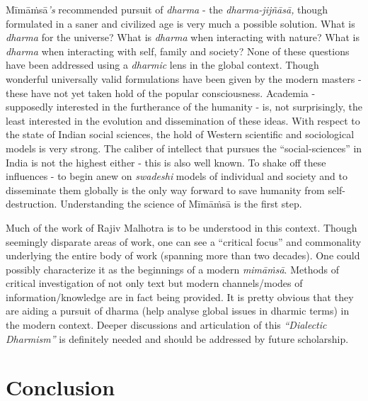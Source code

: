 Mīmāṁsā\textit{’s} recommended pursuit of \textit{dharma} - the \textit{dharma-jijñāsā,} though formulated in a saner and civilized age is very much a possible solution. What is \textit{dharma} for the universe? What is \textit{dharma} when interacting with nature? What is \textit{dharma} when interacting with self, family and society? None of these questions have been addressed using a \textit{dharmic} lens in the global context. Though wonderful universally valid formulations have been given by the modern masters - these have not yet taken hold of the popular consciousness. Academia - supposedly interested in the furtherance of the humanity - is, not surprisingly, the least interested in the evolution and dissemination of these ideas. With respect to the state of Indian social sciences, the hold of Western scientific and sociological models is very strong. The caliber of intellect that pursues the “social-sciences” in India is not the highest either - this is also well known. To shake off these influences - to begin anew on \textit{swadeshi} models of individual and society and to disseminate them globally is the only way forward to save humanity from self-destruction. Understanding the science of Mīmāṁsā is the first step.

Much of the work of Rajiv Malhotra is to be understood in this context. Though seemingly disparate areas of work, one can see a “critical focus” and commonality underlying the entire body of work (spanning more than two decades). One could possibly characterize it as the beginnings of a modern \textit{mimāṁsā}. Methods of critical investigation of not only text but modern channels/modes of information/knowledge are in fact being provided. It is pretty obvious that they are aiding a pursuit of dharma (help analyse global issues in dharmic terms) in the modern context. Deeper discussions and articulation of this \textit{“Dialectic Dharmism”} is definitely needed and should be addressed by future scholarship.


\section*{Conclusion}

